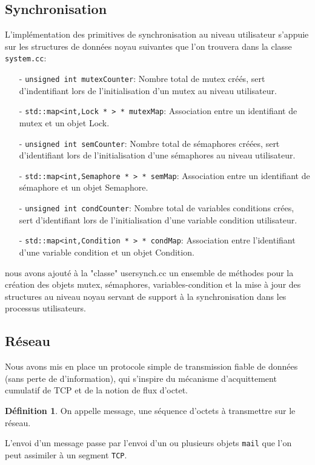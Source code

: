 \documentclass[11pt]{article}
\theoremstyle{definition}
\theoremstyle{definition}
\newtheorem*{myDef}{Définition}
\begin{document}
\subsection{Synchronisation}
L'implémentation des primitives de synchronisation au niveau utilisateur s'appuie sur les structures de données noyau suivantes que l'on trouvera dans la classe \texttt{system.cc}:
\begin{itemize}
\item[-]\texttt{unsigned int mutexCounter}: Nombre total de mutex créés,
  sert d'indentifiant lors de l'initialisation d'un mutex au niveau utilisateur.
\item[-]\texttt{std::map<int,Lock * > * mutexMap}: Association entre un identifiant de mutex
  et un objet Lock.
\item[-]\texttt{unsigned int semCounter}: Nombre total de sémaphores créées,
  sert d'identifiant lors de l'initialisation d'une sémaphores au niveau utilisateur.
\item[-]\texttt{std::map<int,Semaphore * > * semMap}: Association entre un identifiant de sémaphore
  et un objet Semaphore.
\item[-]\texttt{unsigned int condCounter}: Nombre total de variables conditions crées, sert
  d'identifiant lors de l'initialisation d'une variable condition utilisateur.
\item[-]\texttt{std::map<int,Condition * > * condMap}: Association entre l'identifiant d'une variable condition et un objet Condition.
\end{itemize}
nous avons ajouté à la "classe" usersynch.cc un ensemble de méthodes pour la création des objets mutex, sémaphores, variables-condition et la mise à jour des structures au niveau noyau servant de support à la synchronisation dans les processus utilisateurs.

\subsection{Réseau}
Nous avons mis en place un protocole simple de transmission fiable de données (sans perte de d'information), qui s'inspire du mécanisme d'acquittement cumulatif de TCP et de la notion de flux d'octet.
\begin{myDef}
  On appelle message, une séquence d'octets à transmettre sur le réseau.
\end{myDef}
L'envoi d'un message passe par l'envoi d'un ou plusieurs objets \texttt{mail} que l'on peut assimiler à un segment \texttt{TCP}. 
\end{document}
